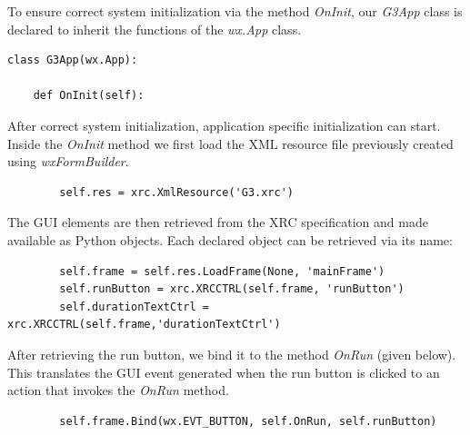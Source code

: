 \documentclass[12pt]{article}
\begin{document}
To ensure correct system initialization via the method {\it OnInit},
our {\it G3App} class is declared to inherit the functions of the {\it
  wx.App} class.

{\footnotesize
\linenumbers
 \begin{verbatim}
class G3App(wx.App):

    def OnInit(self):
 \end{verbatim}
}

After correct system initialization, application specific
initialization can start.  Inside the {\it OnInit} method we first
load the XML resource file previously created using {\it
  wxFormBuilder}.

{\footnotesize
   \linenumbers
 \begin{verbatim}
        self.res = xrc.XmlResource('G3.xrc')
 \end{verbatim}
}

The GUI elements are then retrieved from the XRC specification and
made available as Python objects.  Each declared object can be
retrieved via its name:

{\footnotesize
   \linenumbers
 \begin{verbatim}
        self.frame = self.res.LoadFrame(None, 'mainFrame')
        self.runButton = xrc.XRCCTRL(self.frame, 'runButton')
        self.durationTextCtrl = xrc.XRCCTRL(self.frame,'durationTextCtrl')
 \end{verbatim}
}

After retrieving the run button, we bind it to the method {\it OnRun}
(given below).  This translates the GUI event generated when
the run button is clicked to an action that invokes the {\it OnRun}
method.

{\footnotesize
   \linenumbers
 \begin{verbatim}
        self.frame.Bind(wx.EVT_BUTTON, self.OnRun, self.runButton)
 \end{verbatim} 
}



% 
\end{document}
